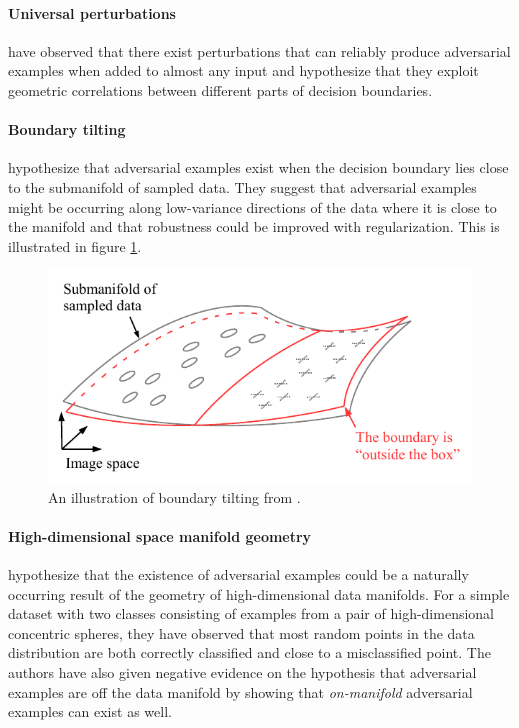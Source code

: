 \documentclass[oneside]{book}
\begin{document}
\paragraph{Universal perturbations} \citet{Moosavi-Dezfooli:2016:UAP} have observed that there exist perturbations that can reliably produce adversarial examples when added to almost any input and hypothesize that they exploit geometric correlations between different parts of decision boundaries. 

\paragraph{Boundary tilting} \citet{Tanay:2016:ABTPPAE} hypothesize that adversarial examples exist when the decision boundary lies close to the submanifold of sampled data. They suggest that adversarial examples might be occurring along low-variance directions of the data where it is close to the manifold and that robustness could be improved with regularization. This is illustrated in figure \ref{fig:tanay-boundary-tilting}.

\begin{figure}[htbp!]
	\begin{center}
		\includegraphics[width=\columnwidth]{figures/adversarial-examples/tanay-newPerspective.pdf}
	\end{center}
	\caption{An illustration of boundary tilting from \citet{Tanay:2016:ABTPPAE}.}
	\label{fig:tanay-boundary-tilting}
\end{figure}

\paragraph{High-dimensional space manifold geometry} \citet{Gilmer:2018:AS} hypothesize that the existence of adversarial examples could be a naturally occurring result of the geometry of high-dimensional data manifolds. For a simple dataset with two classes consisting of examples from a pair of high-dimensional concentric spheres, they have observed that most random points in the data distribution are both correctly classified and close to a misclassified point. The authors have also given negative evidence on the hypothesis that adversarial examples are off the data manifold by showing that \textit{on-manifold} adversarial examples can exist as well.
\end{document}
